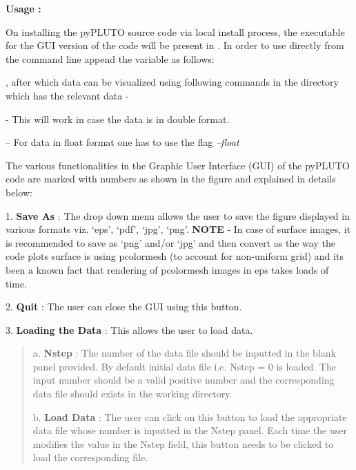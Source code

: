 \documentclass[letterpaper,10pt,english]{sphinxmanual}
\begin{document}
\textbf{Usage :}

On installing the pyPLUTO source code via local install process,
the executable for the GUI version of the code will be present in .
In order to use directly from the command line append the 
variable as follows:

, after which data can be
visualized using following commands in the directory which has the
relevant data -

 - This will work in case the data is in double format.

 -- For data in float format one has to use the flag \emph{--float}

The various functionalities in the Graphic User Interface (GUI) of the
pyPLUTO code are marked with numbers as shown in the figure and explained in details below:

1. \textbf{Save As} : The drop down menu allows the user to save the figure
displayed in various
formats viz. `eps', `pdf', `jpg', `png'. \textbf{NOTE} - In case of surface
images, it is recommended to save as `png' and/or  `jpg' and then
convert as the way the code plots surface is using pcolormesh (to
account for non-uniform grid) and its been a known fact that rendering
of pcolormesh images in eps takes loads of time.

2. \textbf{Quit} : The user can close the GUI using this
button.

3. \textbf{Loading the Data} :  This allows the user to load
data.
\begin{quote}

a. \textbf{Nstep} : The number of the data file should be inputted in the
blank panel provided. By default initial data file i.e. Nstep = 0 is
loaded. The input number should be a valid positive number and the
corresponding data file should exists in the working directory.

b. \textbf{Load Data} : The user can click on this button to load the
appropriate data file whose number is inputted in the Nstep
panel. Each time the user modifies the value in the Nstep field, this
button needs to be clicked to load the corresponding file.
\end{quote}
\end{document}
